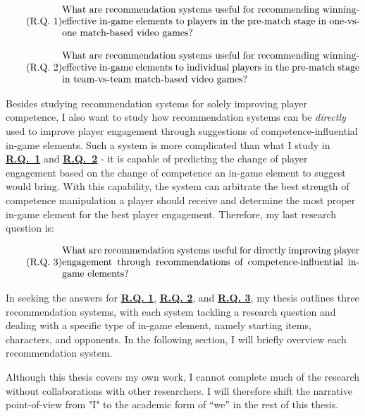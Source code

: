 \begin{equation}
  \tag{R.Q. 1}\label{rq1}
  \parbox{\dimexpr\linewidth-4em}{%
    \strut
    What are recommendation systems useful for recommending winning-effective in-game elements to players in the pre-match stage in one-vs-one match-based video games?
    \strut
  }
\end{equation}


\begin{equation}
  \tag{R.Q. 2}\label{rq2}
  \parbox{\dimexpr\linewidth-4em}{%
    \strut
What are recommendation systems useful for recommending winning-effective in-game elements to individual players in the pre-match stage in team-vs-team match-based video games?
    \strut
  }
\end{equation}


Besides studying recommendation systems for solely improving player competence, I also want to study how recommendation systems can be \textit{directly} used to improve player engagement through suggestions of competence-influential in-game elements. Such a system is more complicated than what I study in \hyperref[rq1]{\textbf{R.Q.~1}} and \hyperref[rq2]{\textbf{R.Q.~2}} - it is capable of predicting the change of player engagement based on the change of competence an in-game element to suggest would bring. With this capability, the system can arbitrate the best strength of competence manipulation a player should receive and determine the most proper in-game element for the best player engagement. Therefore, my last research question is:

\begin{equation}
  \tag{R.Q. 3}\label{rq3}
  \parbox{\dimexpr\linewidth-4em}{%
    \strut
    What are recommendation systems useful for directly improving player engagement through recommendations of competence-influential in-game elements?
    \strut
  }
\end{equation}


In seeking the answers for \hyperref[rq1]{\textbf{R.Q. 1}}, \hyperref[rq2]{\textbf{R.Q. 2}}, and \hyperref[rq3]{\textbf{R.Q. 3}}, my thesis outlines three recommendation systems, with each system tackling a research question and dealing with a specific type of in-game element, namely starting items, characters, and opponents. In the following section, I will briefly overview each recommendation system.

Although this thesis covers my own work, I cannot complete much of the research without collaborations with other researchers. I will therefore shift the narrative point-of-view from "I" to the academic form of “we” in the rest of this thesis.


